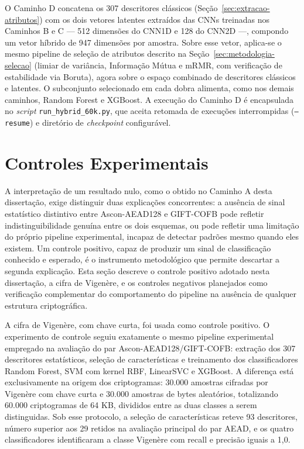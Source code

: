 O Caminho D concatena os 307 descritores clássicos (Seção~\ref{sec:extracao-atributos}) com os dois vetores latentes extraídos das CNNs treinadas nos Caminhos B e C --- 512 dimensões do CNN1D e 128 do CNN2D ---, compondo um vetor híbrido de 947 dimensões por amostra. Sobre esse vetor, aplica-se o mesmo pipeline de seleção de atributos descrito na Seção~\ref{sec:metodologia-selecao} (limiar de variância, Informação Mútua e mRMR, com verificação de estabilidade via Boruta), agora sobre o espaço combinado de descritores clássicos e latentes. O subconjunto selecionado em cada dobra alimenta, como nos demais caminhos, Random Forest e XGBoost. A execução do Caminho D é encapsulada no \emph{script} \texttt{run\_hybrid\_60k.py}, que aceita retomada de execuções interrompidas (\texttt{--resume}) e diretório de \emph{checkpoint} configurável.


\section{Controles Experimentais}
A interpretação de um resultado nulo, como o obtido no Caminho A desta dissertação, exige distinguir duas explicações concorrentes: a ausência de sinal estatístico distintivo entre Ascon-AEAD128 e GIFT-COFB pode refletir indistinguibilidade genuína entre os dois esquemas, ou pode refletir uma limitação do próprio pipeline experimental, incapaz de detectar padrões mesmo quando eles existem. Um controle positivo, capaz de produzir um sinal de classificação conhecido e esperado, é o instrumento metodológico que permite descartar a segunda explicação. Esta seção descreve o controle positivo adotado nesta dissertação, a cifra de Vigenère, e os controles negativos planejados como verificação complementar do comportamento do pipeline na ausência de qualquer estrutura criptográfica.

A cifra de Vigenère, com chave curta, foi usada como controle positivo. O experimento de controle seguiu exatamente o mesmo pipeline experimental empregado na avaliação do par Ascon-AEAD128/GIFT-COFB: extração dos 307 descritores estatísticos, seleção de características e treinamento dos classificadores Random Forest, SVM com kernel RBF, LinearSVC e XGBoost. A diferença está exclusivamente na origem dos criptogramas: 30.000 amostras cifradas por Vigenère com chave curta e 30.000 amostras de bytes aleatórios, totalizando 60.000 criptogramas de 64 KB, divididos entre as duas classes a serem distinguidas. Sob esse protocolo, a seleção de características reteve 93 descritores, número superior aos 29 retidos na avaliação principal do par AEAD, e os quatro classificadores identificaram a classe Vigenère com recall e precisão iguais a 1,0.

